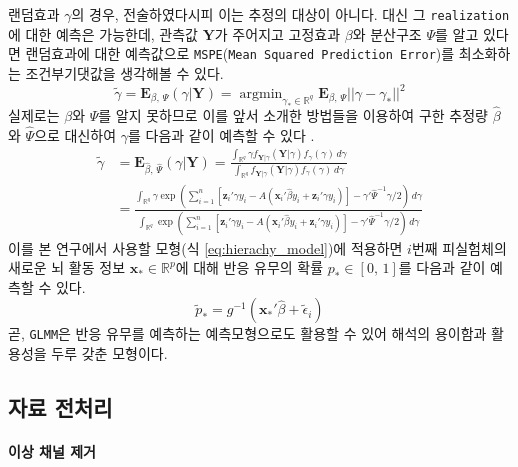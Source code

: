 \documentclass[10pt,onecolumn,twoside,a4size]{gsag3jnl}
\DeclareMathOperator*{\argmin}{argmin}
\begin{document}
랜덤효과 $\gamma$의 경우, 전술하였다시피 이는 추정의 대상이 아니다. 대신 그 \texttt{realization}에 대한 예측은 가능한데, 관측값 $\mathbf{Y}$가 주어지고 고정효과 $\beta$와 분산구조 $\Psi$를 알고 있다면 랜덤효과에 대한 예측값으로 \texttt{MSPE}(\texttt{Mean Squared Prediction Error})를 최소화하는 조건부기댓값을 생각해볼 수 있다.
\begin{equation}
  \widetilde{\gamma}=\mathbf{E}_{\beta,\,\Psi}(\gamma\vert\mathbf{Y})=\argmin_{\gamma_*\in\mathbb{R}^q}\mathbf{E}_{\beta,\,\Psi}||\gamma-\gamma_*||^2
\end{equation}
실제로는 $\beta$와 $\Psi$를 알지 못하므로 이를 앞서 소개한 방법들을 이용하여 구한 추정량 $\widehat{\beta}$와 $\widehat{\Psi}$으로 대신하여 $\gamma$를 다음과 같이 예측할 수 있다 \texttt{\citep{mcculloch2011prediction}}.
\begin{align}
  \widetilde{\gamma}&=\mathbf{E}_{\widehat{\beta},\,\widehat{\Psi}}(\gamma\vert\mathbf{Y})=\frac{\int_{\mathbb{R}^q}\gamma f_{\mathbf{Y}\vert\gamma}(\mathbf{Y}\vert\gamma)f_\gamma(\gamma)\,d\gamma}{\int_{\mathbb{R}^q}f_{\mathbf{Y}\vert\gamma}(\mathbf{Y}\vert\gamma)f_\gamma(\gamma)\,d\gamma}\\
  &=\frac{\int_{\mathbb{R}^q}\gamma\exp(\sum_{i=1}^n[\mathbf{z}_i'\gamma y_i-A(\mathbf{x}_i'\widehat{\beta} y_i+\mathbf{z}_i'\gamma y_i)]-\gamma'\widehat{\Psi}^{-1}\gamma/2)\,d\gamma}{\int_{\mathbb{R}^q}\exp(\sum_{i=1}^n[\mathbf{z}_i'\gamma y_i-A(\mathbf{x}_i'\widehat{\beta} y_i+\mathbf{z}_i'\gamma y_i)]-\gamma'\widehat{\Psi}^{-1}\gamma/2)\,d\gamma}\nonumber
\end{align}
이를 본 연구에서 사용할 모형(식 \ref{eq:hierachy_model})에 적용하면 $i$번째 피실험체의 새로운 뇌 활동 정보 $\mathbf{x}_*\in\mathbb{R}^p$에 대해 반응 유무의 확률 $p_*\in[0,\,1]$를 다음과 같이 예측할 수 있다.
\begin{equation}
  \widetilde{p}_*=g^{-1}(\mathbf{x}_*'\widehat{\beta}+\widetilde{\epsilon}_i)
\end{equation}
곧, \texttt{GLMM}은 반응 유무를 예측하는 예측모형으로도 활용할 수 있어 해석의 용이함과 활용성을 두루 갖춘 모형이다.

\subsection{자료 전처리}
\paragraph{이상 채널 제거}
\end{document}
